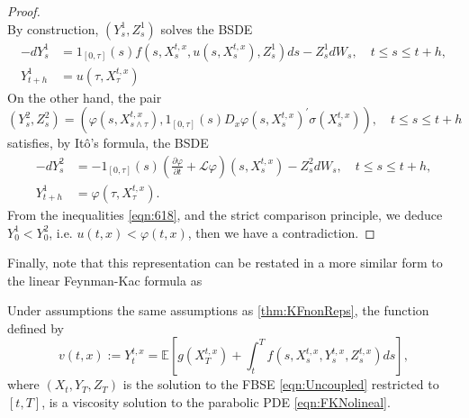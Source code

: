 \begin{proof}
$$$$
By construction, $\left(Y_s^1, Z_s^1\right)$ solves the BSDE
$$
\begin{aligned}
	-d Y_s^1 & =1_{[0, \tau]}(s) f\left(s, X_s^{t, x}, u\left(s, X_s^{t, x}\right), Z_s^1\right) d s-Z_s^1 d W_s, \quad t \leq s \leq t+h, \\
	Y_{t+h}^1 & =u\left(\tau, X_\tau^{t, x}\right)
\end{aligned}
$$
On the other hand, the pair
$$
\left(Y_s^2, Z_s^2\right)=\left(\varphi\left(s, X_{s \wedge \tau}^{t, x}\right), 1_{[0, \tau]}(s) D_x \varphi\left(s, X_s^{t, x}\right)^{\prime} \sigma\left(X_s^{t, x}\right)\right), \quad t \leq s \leq t+h
$$
satisfies, by Itô's formula, the BSDE
$$
\begin{aligned}
	-d Y_s^2 & =-1_{[0, \tau]}(s)\left(\frac{\partial \varphi}{\partial t}+\mathcal{L} \varphi\right)\left(s, X_s^{t, x}\right)-Z_s^2 d W_s, \quad t \leq s \leq t+h, \\
	Y_{t+h}^1 & =\varphi\left(\tau, X_\tau^{t, x}\right) .
\end{aligned}
$$
From the inequalities \eqref{eqn:618}, and the strict comparison principle, we deduce $Y_0^1<Y_0^2$, i.e. $u(t, x)<\varphi(t, x)$, then we have a contradiction.
\end{proof}
Finally, note that this representation can be restated in a more similar form to the linear Feynman-Kac formula as
\begin{theorem}[]
	\label{thm:NonlinealFK}
	Under assumptions the same assumptions as \ref{thm:KFnonReps}, the function defined by 
	\begin{equation}
		v(t, x):=Y_t^{t, x}=\mathbb{E}\left[g\left(X_T^{t, x}\right)+\int_t^T f\left(s, X_s^{t, x}, Y_s^{t, x}, Z_s^{t, x}\right) d s\right],
	\end{equation}
where $(X_t,Y_T,Z_T)$ is the solution to the FBSE \ref{eqn:Uncoupled} restricted to $[t,T]$, is a viscosity solution to the parabolic PDE \eqref{eqn:FKNolineal}.
\end{theorem}

